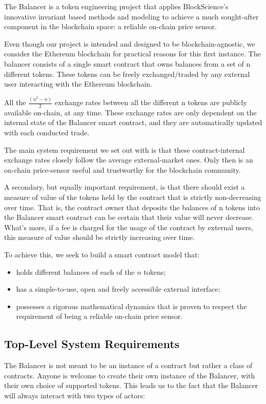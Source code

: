 \documentclass[11pt]{amsart}
\begin{document}
The Balancer is a token engineering project that applies BlockScience's innovative invariant based methods and modeling to achieve a much sought-after component in the blockchain space: a reliable on-chain price sensor. 

Even though our project is intended and designed to be blockchain-agnostic, we consider the Ethereum blockchain for practical reasons for this first instance. The balancer consists of a single smart contract that owns balances from a set of n different tokens. These tokens can be freely exchanged/traded by any external user interacting with the Ethereum blockchain.

All the $\frac{(n^2 - n)}{2}$ exchange rates between all the different n tokens are publicly available on-chain, at any time. These exchange rates are only dependent on the internal state of the Balancer smart contract, and they are automatically updated with each conducted trade. 

The main system requirement we set out with is that these contract-internal exchange rates closely follow the average external-market ones. Only then is an on-chain price-sensor useful and trustworthy for the blockchain community. 

A secondary, but equally important requirement, is that there should exist a measure of value of the tokens held by the contract that is strictly non-decreasing over time. That is, the contract owner that deposits the balances of n tokens into the Balancer smart contract can be certain that their value will never decrease. What's more, if a fee is charged for the usage of the contract by external users, this measure of value should be strictly increasing over time.

To achieve this, we seek to build a smart contract model that:

\begin{itemize}
    \item holds different balances of each of the $n$ tokens;
    \item has a simple-to-use, open and freely accessible external interface;
    \item possesses a rigorous mathematical dynamics that is proven to respect the requirement of being a reliable on-chain price sensor.
\end{itemize}

\subsection{Top-Level System Requirements}
The Balancer is not meant to be an instance of a contract but rather a class of contracts. Anyone is welcome to create their own instance of the Balancer, with their own choice of supported tokens. This leads us to the fact that the Balancer will always interact with two types of actors: 
\end{document}
